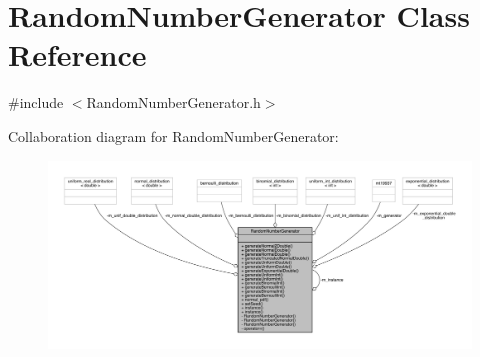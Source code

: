 \hypertarget{class_random_number_generator}{}\section{Random\+Number\+Generator Class Reference}
\label{class_random_number_generator}


{\ttfamily \#include $<$Random\+Number\+Generator.\+h$>$}



Collaboration diagram for Random\+Number\+Generator\+:
\nopagebreak
\begin{figure}[H]
\begin{center}
\leavevmode
\includegraphics[width=350pt]{class_random_number_generator__coll__graph}
\end{center}
\end{figure}
